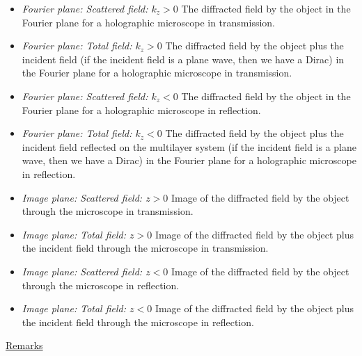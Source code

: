 \begin{itemize}

\item {\it Fourier plane: Scattered field: $k_z>0$} The diffracted
  field by the object in the Fourier plane for a holographic
  microscope in transmission.

\item {\it Fourier plane: Total field: $k_z>0$} The diffracted field
  by the object plus the incident field (if the incident field is a
  plane wave, then we have a Dirac) in the Fourier plane for a
  holographic microscope in transmission.

\item {\it Fourier plane: Scattered field: $k_z<0$} The diffracted
  field by the object in the Fourier plane for a holographic
  microscope in reflection.

\item {\it Fourier plane: Total field: $k_z<0$} The diffracted field
  by the object plus the incident field reflected on the multilayer
  system (if the incident field is a plane wave, then we have a Dirac)
  in the Fourier plane for a holographic microscope in reflection.

\item {\it Image plane: Scattered field: $z>0$} Image of the
  diffracted field by the object through the microscope in
  transmission.

\item {\it Image plane: Total field: $z>0$} Image of the diffracted
  field by the object plus the incident field through the microscope
  in transmission.
  

\item {\it Image plane: Scattered field: $z<0$} Image of the
  diffracted field by the object through the microscope in
  reflection.

\item {\it Image plane: Total field: $z<0$} Image of the diffracted
  field by the object plus the incident field through the microscope
  in reflection.
  

  
\end{itemize}


{\underline{Remarks}}


